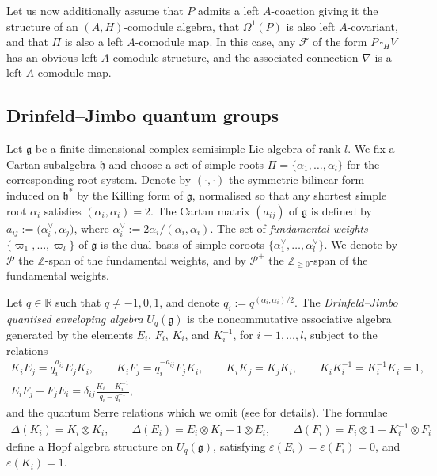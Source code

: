\documentclass[10pt,a4paper]{amsart}
\numberwithin{equation}{section}
\newcommand{\e}{\varepsilon}
\begin{document}
Let us now additionally assume that $P$ admits a left $A$-coaction giving it the structure of an $(A,H)$-comodule algebra, that $\Omega^1(P)$ is also left $A$-covariant, and that $\Pi$ is also a left $A$-comodule map. In this case, any $\mathcal{F}$ of the form $P \, \square_H V$ has an obvious left $A$-comodule structure, and the associated connection $\nabla$ is a left $A$-comodule map.

\subsection{Drinfeld--Jimbo quantum groups}\label{section2.4}

Let $\mathfrak{g}$ be a finite-dimensional complex semisimple Lie algebra of rank $l$. We fix a Cartan subalgebra $\mathfrak{h}$ and choose a set of simple roots $\Pi = \{\alpha_1, \dots, \alpha_l\}$ for the corresponding root system. Denote by $(\cdot,\cdot)$ the symmetric bilinear form induced on $\mathfrak{h}^*$ by the Killing form of $\mathfrak{g}$, normalised so that any shortest simple root $\alpha_i$ satisfies $(\alpha_i,\alpha_i) = 2$. The Cartan matrix $(a_{ij})$ of $\mathfrak{g}$ is defined by
$a_{ij} := \big(\alpha_i^{\vee},\alpha_j\big)$,
where $\alpha_i^{\vee} := 2\alpha_i/(\alpha_i,\alpha_i)$. The set of {\em fundamental weights} $\{\varpi_1, \dots, \varpi_l\}$ of $\mathfrak{g}$ is the dual basis of simple coroots $\big\{\alpha_1^{\vee},\dots, \alpha_l^{\vee}\big\}$. We denote by $\mathcal{P}$ the $\mathbb{Z}$-span of the fundamental weights, and by
${\mathcal P}^+$ the $\mathbb{Z}_{\geq 0}$-span of the fundamental weights.

Let $q \in \mathbb{R}$ such that $q \neq -1,0,1$, and denote $q_i := q^{(\alpha_i,\alpha_i)/2}$. The {\em Drinfeld--Jimbo quantised enveloping algebra} $U_q(\mathfrak{g})$ is the noncommutative associative algebra generated by the elements $E_i$, $F_i$, $K_i$, and $K^{-1}_i$, for $ i=1, \ldots, l$, subject to the relations
\begin{gather*}
 K_iE_j = q_i^{a_{ij}} E_j K_i, \qquad K_iF_j= q_i^{-a_{ij}} F_j K_i, \qquad K_i K_j = K_j K_i, \qquad K_iK_i^{-1} = K_i^{-1}K_i = 1,\\
 E_iF_j - F_jE_i = \delta_{ij}\frac{K_i - K^{-1}_{i}}{q_i-q_i^{-1}},
\end{gather*}
and the quantum Serre relations which we omit (see \cite[Section~6.1.2]{KSLeabh} for details). The formulae
\begin{gather*}
\Delta(K_i) = K_i \otimes K_i, \qquad \Delta(E_i) = E_i \otimes K_i + 1 \otimes E_i, \qquad \Delta(F_i) = F_i \otimes 1 + K_i^{-1} \otimes F_i
\end{gather*}
define a Hopf algebra structure on $U_q(\mathfrak{g})$, satisfying $\e(E_i) = \e(F_i) = 0$, and $\e(K_i) = 1$.
\end{document}
